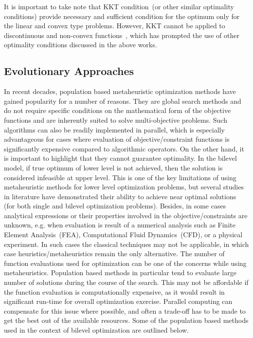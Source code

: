 It is important to take note that KKT condition~(or other similar optimality conditions)  provide necessary and sufficient condition for the optimum only for the linear and convex type problems. However, KKT cannot be applied to discontinuous and non-convex functions~\cite{sahin1998dual}, which has prompted the use of other optimality conditions discussed in the above works. 


\subsection{Evolutionary Approaches}
\label{population_all}

In recent decades, population based metaheuristic optimization methods have gained popularity for a number of reasons. They are global search methods and do not require specific conditions on the mathematical form of the objective functions and are inherently suited to solve multi-objective problems. Such algorithms can also be readily implemented in parallel, which is especially advantageous for cases where evaluation of objective/constraint functions is significantly expensive compared to algorithmic operators. On the other hand, it is important to highlight that they cannot guarantee optimality. In the bilevel model, if true optimum of lower level is not achieved, then the solution is considered infeasible at upper level. This is one of the key limitations of using metaheuristic methods for lower level optimization problems, but several studies in literature have demonstrated their ability to achieve near optimal solutions (for both single and bilevel optimization problems). Besides, in some cases analytical expressions or their properties involved in the objective/constraints are unknown, e.g. when evaluation is result of a numerical analysis such as Finite Element Analysis~(FEA), Computational Fluid Dynamics~(CFD), or a physical experiment. In such cases the classical techniques may not be applicable, in which case heuristics/metaheuristics remain the only alternative. The number of function evaluations used for optimization can be one of the concerns while using metaheuristics. Population based methods in particular tend to evaluate large number of solutions during the course of the search. This may not be affordable if the function evaluation is computationally expensive, as it would result in significant run-time for overall optimization exercise. Parallel computing can compensate for this issue where possible, and often a trade-off has to be made to get the best out of the available resources. Some of the population based methods used in the context of bilevel optimization are outlined below. 

